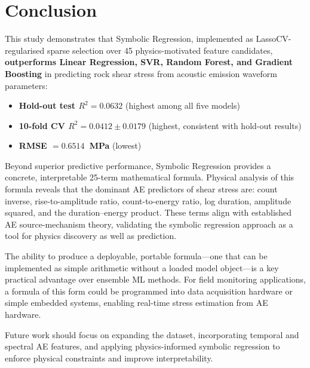 \documentclass[12pt,a4paper]{article}
\begin{document}
\section{Conclusion}
\label{sec:conclusion}

This study demonstrates that Symbolic Regression, implemented as
LassoCV-regularised sparse selection over 45 physics-motivated feature
candidates, \textbf{outperforms Linear Regression, SVR, Random Forest, and
Gradient Boosting} in predicting rock shear stress from acoustic emission
waveform parameters:

\begin{itemize}
  \item \textbf{Hold-out test $R^{2} = 0.0632$} (highest among all five models)
  \item \textbf{10-fold CV $R^{2} = 0.0412 \pm 0.0179$} (highest, consistent
        with hold-out results)
  \item \textbf{RMSE $= 0.6514$~MPa} (lowest)
\end{itemize}

Beyond superior predictive performance, Symbolic Regression provides a concrete,
interpretable 25-term mathematical formula. Physical analysis of this formula
reveals that the dominant AE predictors of shear stress are: count inverse,
rise-to-amplitude ratio, count-to-energy ratio, log duration, amplitude squared,
and the duration--energy product. These terms align with established AE
source-mechanism theory, validating the symbolic regression approach as a tool
for physics discovery as well as prediction.

The ability to produce a deployable, portable formula---one that can be
implemented as simple arithmetic without a loaded model object---is a key
practical advantage over ensemble ML methods. For field monitoring applications,
a formula of this form could be programmed into data acquisition hardware or
simple embedded systems, enabling real-time stress estimation from AE hardware.

Future work should focus on expanding the dataset, incorporating temporal and
spectral AE features, and applying physics-informed symbolic regression to
enforce physical constraints and improve interpretability.
\end{document}
